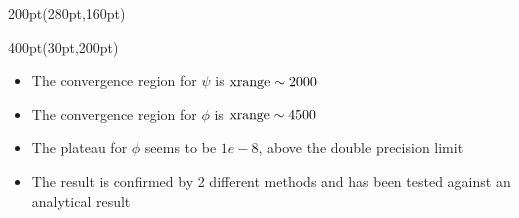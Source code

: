 \begin{frame}
\begin{textblock*}{200pt}(280pt,160pt)
\end{textblock*}



%
%
%
%


\begin{textblock*}{400pt}(30pt,200pt)
\footnotesize
\begin{itemize}
\scriptsize
\item The convergence region for $\psi$ is ${\rm xrange} \sim 2000$
\item The convergence region for $\phi$ is ${\rm xrange} \sim 4500$
\item The plateau for $\phi$ seems to be $1e-8$, 
above the double precision limit
\item The result is confirmed by 2 different methods and has been tested 
against an analytical result
\end{itemize}
\end{textblock*}


\end{frame}




